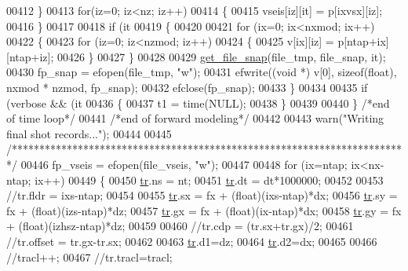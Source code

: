 \begin{DoxyCode}
{{{{{{{{{{{{{{{00412         \}
00413         \textcolor{keywordflow}{for}(iz=0; iz<nz; iz++)
00414         \{
00415             vseis[iz][it] = p[ixvsx][iz];
00416         \}
00417 
00418         \textcolor{keywordflow}{if} (it %
00419         \{
00420 
00421             \textcolor{keywordflow}{for} (ix=0; ix<nxmod; ix++)
00422             \{
00423                 \textcolor{keywordflow}{for} (iz=0; iz<nzmod; iz++)
00424                 \{
00425                     v[ix][iz] = p[ntap+ix][ntap+iz];
00426                 \}
00427             \}
00428 
00429             \hyperlink{a00002_a04b292299a5a7ebbba7b88f61efee2da}{get\_file\_snap}(file\_tmp, file\_snap, it);
00430             fp\_snap = efopen(file\_tmp, \textcolor{stringliteral}{"w"});
00431             efwrite((\textcolor{keywordtype}{void} *) v[0], \textcolor{keyword}{sizeof}(\textcolor{keywordtype}{float}), nxmod * nzmod, fp\_snap);
00432             efclose(fp\_snap);
00433         \}
00434 
00435         \textcolor{keywordflow}{if} (verbose && (it%
00436         \{
00437             t1 = time(NULL);
00438         \}
00439 
00440     \} \textcolor{comment}{/*end of time loop*/}
00441     \textcolor{comment}{/*end of forward modeling*/}
00442 
00443     warn(\textcolor{stringliteral}{"Writing final shot records..."});
00444 
00445     \textcolor{comment}{/************************************************************************/}
00446     fp\_vseis = efopen(file\_vseis, \textcolor{stringliteral}{"w"});
00447 
00448     \textcolor{keywordflow}{for} (ix=ntap; ix<nx-ntap; ix++)
00449     \{
00450         \hyperlink{a00002_a21ee33da3f54e2ea55665c50bfebd740}{tr}.ns = nt;
00451         \hyperlink{a00002_a21ee33da3f54e2ea55665c50bfebd740}{tr}.dt = dt*1000000;
00452 
00453         \textcolor{comment}{//tr.fldr = ixs-ntap;}
00454 
00455         \hyperlink{a00002_a21ee33da3f54e2ea55665c50bfebd740}{tr}.sx = fx + (float)(ixs-ntap)*dx;
00456         \hyperlink{a00002_a21ee33da3f54e2ea55665c50bfebd740}{tr}.sy = fx + (float)(izs-ntap)*dz;
00457         \hyperlink{a00002_a21ee33da3f54e2ea55665c50bfebd740}{tr}.gx = fx + (float)(ix-ntap)*dx;
00458         \hyperlink{a00002_a21ee33da3f54e2ea55665c50bfebd740}{tr}.gy = fx + (float)(izhsz-ntap)*dz;
00459 
00460         \textcolor{comment}{//tr.cdp = (tr.sx+tr.gx)/2;}
00461         \textcolor{comment}{//tr.offset = tr.gx-tr.sx;}
00462 
00463         \hyperlink{a00002_a21ee33da3f54e2ea55665c50bfebd740}{tr}.d1=dz;
00464         \hyperlink{a00002_a21ee33da3f54e2ea55665c50bfebd740}{tr}.d2=dx;
00465 
00466         \textcolor{comment}{//tracl++;}
00467         \textcolor{comment}{//tr.tracl=tracl;}
}}}}}}}}}}}}}}}
\end{DoxyCode}
